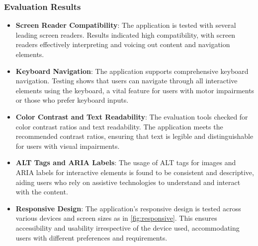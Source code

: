 \subsubsection{Evaluation Results}
\begin{itemize}
  \item \textbf{Screen Reader Compatibility}: The application is tested with several leading screen readers. Results indicated high compatibility, with screen readers effectively interpreting and voicing out content and navigation elements.
  \item \textbf{Keyboard Navigation}: The application supports comprehensive keyboard navigation. Testing shows that users can navigate through all interactive elements using the keyboard, a vital feature for users with motor impairments or those who prefer keyboard inputs.
  \item \textbf{Color Contrast and Text Readability}: The evaluation tools checked for color contrast ratios and text readability. The application meets the recommended contrast ratios, ensuring that text is legible and distinguishable for users with visual impairments.
  \item \textbf{ALT Tags and ARIA Labels}: The usage of ALT tags for images and ARIA labels for interactive elements is found to be consistent and descriptive, aiding users who rely on assistive technologies to understand and interact with the content.
  \item \textbf{Responsive Design}: The application's responsive design is tested across various devices and screen sizes as in \ref{fig:responsive}. This ensures accessibility and usability irrespective of the device used, accommodating users with different preferences and requirements.
\end{itemize}

